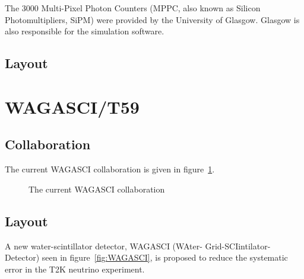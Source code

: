 The 3000 Multi-Pixel Photon Counters (MPPC, also known as Silicon Photomultipliers, SiPM) were provided by the University of Glasgow. Glasgow is also responsible for the simulation software.
\subsection{Layout}


\section{WAGASCI/T59}


\subsection{Collaboration}

The current WAGASCI collaboration is given in figure~\ref{fig:collaborationW}.
\begin{figure}[h!]
\centering
{}
\caption{The current WAGASCI collaboration}
\label{fig:collaborationW}
\end{figure}

\subsection{Layout}
A new water-scintillator detector, WAGASCI (WAter- Grid-SCIintilator-Detector) seen in figure~\ref{fig:WAGASCI}, is proposed to reduce the systematic error in the T2K neutrino experiment.

